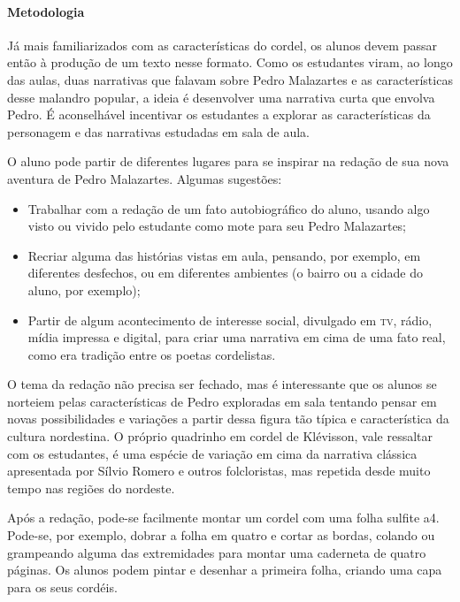 \documentclass[11pt]{extarticle}
\begin{document}
\paragraph{Metodologia} Já mais familiarizados com as características do cordel, os alunos devem passar então à produção de um texto nesse formato. Como os estudantes viram, ao longo das aulas, duas narrativas que falavam sobre Pedro Malazartes e as características desse malandro popular, a ideia é desenvolver uma narrativa curta que envolva Pedro.
É aconselhável incentivar os estudantes a explorar as características da personagem e das narrativas estudadas em sala de aula.

O aluno pode partir de diferentes lugares para se inspirar na redação de sua nova aventura de Pedro Malazartes. 
Algumas sugestões:

\begin{itemize}
\item Trabalhar com a redação de um fato autobiográfico do aluno, usando algo visto ou vivido pelo estudante como mote para seu Pedro Malazartes;

\item Recriar alguma das histórias vistas em aula, pensando, por exemplo, em diferentes desfechos, ou em diferentes ambientes (o bairro ou a cidade do aluno, por exemplo);

\item Partir de algum acontecimento de interesse social, divulgado em \textsc{tv}, rádio, mídia impressa e digital, para criar uma narrativa em cima de uma fato real, como era tradição entre os poetas cordelistas.
\end{itemize}

O tema da redação não precisa ser fechado, mas é interessante que os alunos se norteiem pelas características de Pedro exploradas em sala tentando pensar em novas possibilidades e variações a partir dessa figura tão típica e característica da cultura nordestina.
O próprio quadrinho em cordel de Klévisson, vale ressaltar com os estudantes, é uma espécie de variação em cima da narrativa clássica apresentada por Sílvio Romero e outros folcloristas, mas repetida desde muito tempo nas regiões do nordeste.

Após a redação, pode-se facilmente montar um cordel com uma folha sulfite a4. 
Pode-se, por exemplo, dobrar a folha em quatro e cortar as bordas, colando ou grampeando alguma das extremidades para montar uma caderneta de quatro páginas.
Os alunos podem pintar e desenhar a primeira folha, criando uma capa para os seus cordéis.
\end{document}
